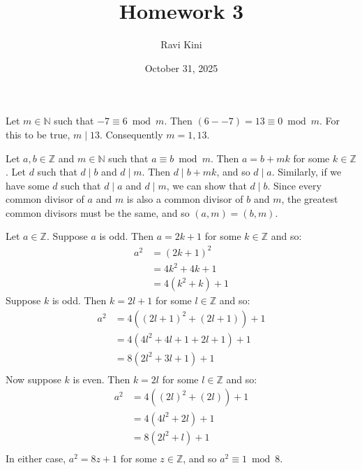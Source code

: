 \documentclass{article}
\title{Homework 3}
\author{Ravi Kini}
\date{October 31, 2025}
\begin{document}
\maketitle

\problem{}
Let $m \in \mathbb{N}$ such that $-7 \equiv 6 \bmod m$. Then $(6 - -7) = 13 \equiv 0 \bmod m$. For this to be true, $m \mid 13$. Consequently $m = 1, 13$.

\clearpage
\problem{}
Let $a, b \in \mathbb{Z}$ and $m \in \mathbb{N}$ such that $a \equiv b \bmod m$. Then $a = b + mk$ for some $k \in \mathbb{Z}$. Let $d$ such that $d \mid b$ and $d \mid m$. Then $d \mid b + mk$, and so $d \mid a$. Similarly, if we have some $d$ such that $d \mid a$ and $d \mid m$, we can show that $d \mid b$. Since every common divisor of $a$ and $m$ is also a common divisor of $b$ and $m$, the greatest common divisors must be the same, and so $(a, m) = (b, m)$.

\clearpage
\problem{}
Let $a \in \mathbb{Z}$. Suppose $a$ is odd. Then $a = 2k + 1$ for some $k \in \mathbb{Z}$ and so:
\begin{align*}
    a^2 & = {(2k + 1)}^2 \\
    & = 4k^2 + 4k + 1 \\
    & = 4(k^2 + k) + 1
\end{align*}
Suppose $k$ is odd. Then $k = 2l + 1$ for some $l \in \mathbb{Z}$ and so:
\begin{align*}
    a^2 & = 4({(2l + 1)}^2 + (2l + 1)) + 1 \\
    & = 4(4l^2 + 4l + 1 + 2l + 1) + 1\\
    & = 8(2l^2 + 3l + 1) + 1 \\
\end{align*}
Now suppose $k$ is even. Then $k = 2l$ for some $l \in \mathbb{Z}$ and so:
\begin{align*}
    a^2 & = 4({(2l)}^2 + (2l)) + 1 \\
    & = 4(4l^2 + 2l) + 1\\
    & = 8(2l^2 + l) + 1 \\
\end{align*}
In either case, $a^2 = 8z + 1$ for some $z \in \mathbb{Z}$, and so $a^2 \equiv 1 \bmod 8$.
\end{document}
